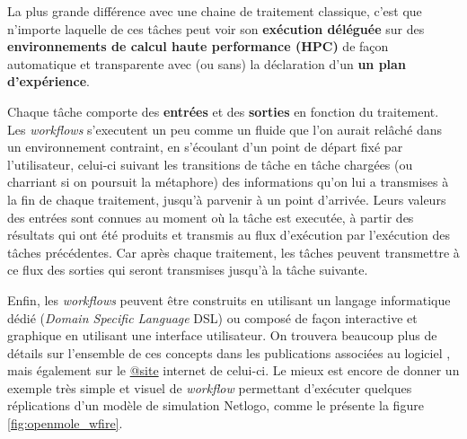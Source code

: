 La plus grande différence avec une chaine de traitement classique, c'est que n'importe laquelle de ces tâches peut voir son \textbf{exécution déléguée} sur des \textbf{environnements de calcul haute performance (HPC)} de façon automatique et transparente avec (ou sans) la déclaration d'un \textbf{un plan d'expérience}.

Chaque tâche comporte des \textbf{entrées} et des \textbf{sorties} en fonction du traitement. Les \textit{workflows} s'executent un peu comme un fluide que l'on aurait relâché dans un environnement contraint, en s'écoulant d'un point de départ fixé par l'utilisateur, celui-ci suivant les transitions de tâche en tâche chargées (ou charriant si on poursuit la métaphore) des informations qu'on lui a transmises à la fin de chaque traitement, jusqu'à parvenir à un point d'arrivée. Leurs valeurs des entrées sont connues au moment où la tâche est executée, à partir des résultats qui ont été produits et transmis au flux d'exécution par l'exécution des tâches précédentes. Car après chaque traitement, les tâches peuvent transmettre à ce flux des sorties qui seront transmises jusqu'à la tâche suivante.

Enfin, les \textit{workflows} peuvent être construits en utilisant un langage informatique dédié  (\textit{Domain Specific Language} DSL) ou composé de façon interactive et graphique en utilisant une interface utilisateur. On trouvera beaucoup plus de détails sur l'ensemble de ces concepts dans les publications associées au logiciel \autocites{Reuillon2008a, Reuillon2013}, mais également sur le \href{http://www.openmole.org}{@site} internet de celui-ci. Le mieux est encore de donner un exemple très simple et visuel de \textit{workflow} permettant d'exécuter quelques réplications d'un modèle de simulation Netlogo, comme le présente la figure \ref{fig:openmole_wfire}.

